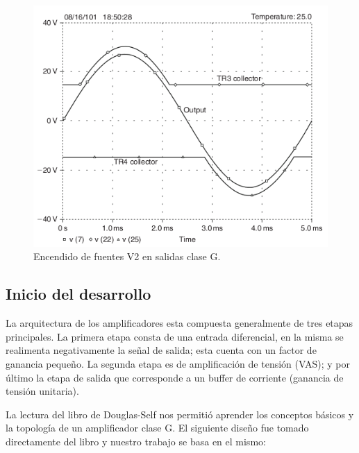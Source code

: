 \documentclass[a4paper,12pt,twoside]{article}
\begin{document}
\begin{figure}[H]
 \centering
 \includegraphics[scale=0.55]{img/ampliG_salida.png}
 \caption{Encendido de fuentes V2 en salidas clase G.}
 \label{ampliG_salida} 
 \end{figure}

\subsection{Inicio del desarrollo}

La arquitectura de los amplificadores esta compuesta generalmente de tres etapas principales. La primera etapa consta de una entrada diferencial, en la misma se realimenta negativamente la señal de salida; esta cuenta con un factor de ganancia pequeño. La segunda etapa es de amplificación de tensión (VAS); y por último la etapa de salida que corresponde a un buffer de corriente (ganancia de tensión unitaria).

La lectura del libro de Douglas-Self nos permitió aprender los conceptos básicos y la topología de un amplificador clase G. El siguiente diseño fue tomado directamente del libro y nuestro trabajo se basa en el mismo:
\end{document}
